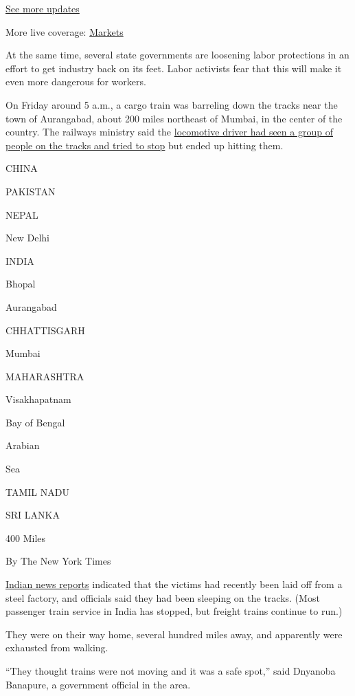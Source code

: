 \href{https://www.nytimes.com/2020/08/01/world/coronavirus-covid-19.html?action=click\&pgtype=Article\&state=default\&region=MAIN_CONTENT_1\&context=storylines_live_updates}{See
more updates}

More live coverage:
\href{https://www.nytimes.com/live/2020/07/31/business/stock-market-today-coronavirus?action=click\&pgtype=Article\&state=default\&region=MAIN_CONTENT_1\&context=storylines_live_updates}{Markets}

At the same time, several state governments are loosening labor
protections in an effort to get industry back on its feet. Labor
activists fear that this will make it even more dangerous for workers.

On Friday around 5 a.m., a cargo train was barreling down the tracks
near the town of Aurangabad, about 200 miles northeast of Mumbai, in the
center of the country. The railways ministry said the
\href{https://twitter.com/RailMinIndia/status/1258595033260929029}{locomotive
driver had seen a group of people on the tracks and tried to stop} but
ended up hitting them.

CHINA

PAKISTAN

NEPAL

New Delhi

INDIA

Bhopal

Aurangabad ~~~~

CHHATTISGARH

Mumbai

MAHARASHTRA

Visakhapatnam ~~~~

Bay of Bengal

Arabian

Sea

TAMIL NADU

SRI LANKA

400 Miles

By The New York Times

\href{https://thewire.in/rights/aurangabad-migrant-workers-goods-train-killed}{Indian
news reports} indicated that the victims had recently been laid off from
a steel factory, and officials said they had been sleeping on the
tracks. (Most passenger train service in India has stopped, but freight
trains continue to run.)

They were on their way home, several hundred miles away, and apparently
were exhausted from walking.

``They thought trains were not moving and it was a safe spot,'' said
Dnyanoba Banapure, a government official in the area.

